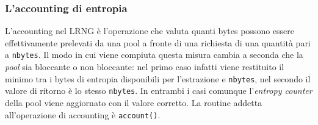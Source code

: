 \documentclass{article}
\begin{document}
 \subsubsection{L'accounting di entropia}\label{account}
 L'accounting nel LRNG è l'operazione che valuta quanti bytes possono essere
 effettivamente prelevati da una pool a fronte di una richiesta di
 una quantità pari a \verb+nbytes+.
 Il modo in cui viene compiuta questa misura cambia a seconda che la
 \emph{pool} sia bloccante o non bloccante: nel primo caso infatti viene
 restituito il minimo tra i bytes di entropia disponibili per l'estrazione e
 \verb+nbytes+, nel secondo il valore di ritorno è lo stesso \verb+nbytes+.
 In entrambi i casi comunque l'\emph{entropy counter} della pool viene
 aggiornato con il valore corretto. La routine addetta all'operazione di accounting è
 \verb+account()+.
 
\end{document}
